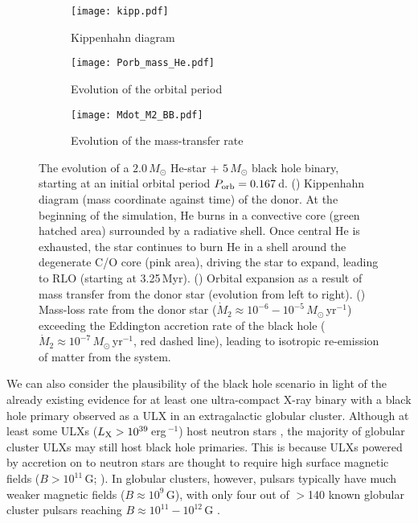 \documentclass[a4paper,fleqn,usenatbib]{mnras}
\begin{document}
\begin{figure}
	\begin{subfigure}[b]{\columnwidth}
	\texttt{[image: kipp.pdf]}
	\caption{Kippenhahn diagram}
	\label{fig:kipp}
	\end{subfigure}
	\hfill
	\begin{subfigure}[b]{\columnwidth}
	\texttt{[image: Porb\_mass\_He.pdf]}
	\caption{Evolution of the orbital period}
	\label{fig:p_evo}
	\end{subfigure}
	\hfill
	\begin{subfigure}[b]{\columnwidth}
	\texttt{[image: Mdot\_M2\_BB.pdf]}
	\caption{Evolution of the mass-transfer rate}
	\label{fig:mdot_evo}
	\end{subfigure}
\caption{The evolution of a $2.0\,M_\odot$  He-star + $5\,M_\odot$ black hole binary, starting at an initial orbital period $P_{\rm orb} = 0.167$\,d. () Kippenhahn diagram (mass coordinate against time) of the donor. At the beginning of the simulation, He burns in a convective core (green hatched area) surrounded by a radiative shell. Once central He is exhausted, the star continues to burn He in a shell around the degenerate C/O core (pink area), driving the star to expand, leading to RLO (starting at 3.25\,Myr). () Orbital expansion as a result of mass transfer from the donor star (evolution from left to right). () Mass-loss rate from the donor star ($\dot{M}_2 \approx 10^{-6} - 10^{-5}\,M_\odot$\,yr$^{-1}$) exceeding the Eddington accretion rate of the black hole ($\dot{M}_2 \approx 10^{-7}\,M_\odot$\,yr$^{-1}$, red dashed line), leading to isotropic re-emission of matter from the system.} 
\label{fig:evo}
\end{figure}

We can also consider the plausibility of the black hole scenario in light of the already existing evidence for at least one ultra-compact X-ray binary with a black hole primary observed as a ULX in an extragalactic globular cluster. Although at least some ULXs ($L_{\rm X} > 10^{39}$\,erg\,$^{-1}$) host neutron stars \citep{2014Natur.514..202B, 2017Sci...355..817I, 2017MNRAS.466L..48I}, the majority of globular cluster ULXs may still host black hole primaries. This is because ULXs powered by accretion on to neutron stars are thought to require high surface magnetic fields ($B > 10^{11}$\,G; \citealp{2016MNRAS.458L..10K, 2015MNRAS.448L..40E, 2016MNRAS.457.1101T}). In globular clusters, however, pulsars typically have much weaker magnetic fields ($B \approx 10^9$\,G), with only four out of $>$140 known globular cluster pulsars reaching $B \approx 10^{11}-10^{12}$\,G \citep{2011ApJ...742...51B}.
\end{document}
